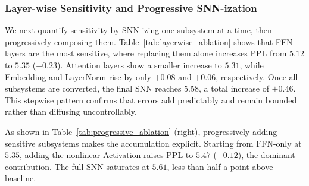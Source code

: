 \documentclass{article}
\theoremstyle{plain}
\theoremstyle{definition}
\theoremstyle{remark}
\begin{document}
\subsubsection{Layer-wise Sensitivity and Progressive SNN-ization}

We next quantify sensitivity by SNN-izing one subsystem at a time, then progressively composing them. Table~\ref{tab:layerwise_ablation} shows that FFN layers are the most sensitive, where replacing them alone increases PPL from $5.12$ to $5.35$ ($+0.23$). Attention layers show a smaller increase to $5.31$, while Embedding and LayerNorm rise by only $+0.08$ and $+0.06$, respectively. Once all subsystems are converted, the final SNN reaches $5.58$, a total increase of $+0.46$. This stepwise pattern confirms that errors add predictably and remain bounded rather than diffusing uncontrollably.

As shown in Table~\ref{tab:progressive_ablation} (right), progressively adding sensitive subsystems makes the accumulation explicit. Starting from FFN-only at $5.35$, adding the nonlinear Activation raises PPL to $5.47$ ($+0.12$), the dominant contribution. The full SNN saturates at $5.61$, less than half a point above baseline.
\end{document}
